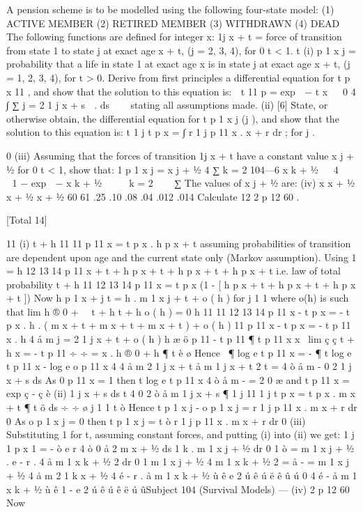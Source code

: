 A pension scheme is to be modelled using the following four-state model:
(1)
ACTIVE MEMBER
(2)
RETIRED MEMBER
(3)
WITHDRAWN
(4)
DEAD
The following functions are defined for integer x:
\mu 1j
x + t = force of transition from state 1 to state j at exact age x + t,
(j = 2, 3, 4), for 0 \leq t < 1.
t
(i)
p 1 x j = probability that a life in state 1 at exact age x is in state j at
exact age x + t, (j = 1, 2, 3, 4), for t > 0.
Derive from first principles a differential equation for t p x 11 , and show
that the solution to this equation is:
 t
11
p
=
exp
 −
t x

 0
4
∫ ∑ \mu
j = 2
1 j
x + s

. ds 


stating all assumptions made.
(ii)
[6]
State, or otherwise obtain, the differential equation for t p 1 x j (j ), and
show that the solution to this equation is:
t
1 j
t p x =
∫
r
1 j
p 11
x . \mu x + r dr ;
for j .

0
(iii)
Assuming that the forces of transition \mu 1j
x + t have a constant value
 x j + 1⁄2 for 0 \leq t < 1, show that:
1
p 1 x j =
 x j + 1⁄2
4
∑
k = 2
104—6
 x k + 1⁄2

 4
 
  1 − exp  −  x k + 1⁄2   
 k = 2
 

∑
The values of  x j + 1⁄2 are:
(iv)
x 
x + 1⁄2 
x + 1⁄2 
x + 1⁄2
60
61 .25
.10 .08
.04 .012
.014
Calculate
12
2
p 12
60 .

[Total 14]


\new%

11
(i)
t + h
11
11
p 11
x = t p x . h p x + t
assuming probabilities of transition are dependent upon age and the
current state only (Markov assumption).
Using 1 =
h
12
13
14
p 11
x + t + h p x + t + h p x + t + h p x + t
i.e. law of total probability
t + h
11
12
13
14
p 11
x = t p x (1 - [ h p x + t + h p x + t + h p x + t ])
Now
h
p 1 x + j t = h . m 1 x j + t + o ( h )
for j 1 1
where o(h) is such that lim
h ® 0 +
\
\
t + h
t + h
o ( h )
= 0
h
11
11
12
13
14
p 11
x - t p x = - t p x . h . ( m x + t + m x + t + m x + t ) + o ( h )
11
p 11
x - t p x
= - t p 11
x .
h
4
å m
j = 2
1 j
x + t
+
o ( h )
h
æ
ö
p 11 - t p 11
¶ t p 11
x
x
\ lim ç ç t + h x
= - t p 11
÷ ÷ =
x .
h ® 0 +
h
¶ t
è
ø
Hence
\
¶ log e t p 11
x
= -
¶ t
log e t p 11
x
-
log e o p 11
x
4
4
å m
2
1 j
x + t
å m
1 j
x + t
2
t
=
4
ò å m
-
0
2
1 j
x + s ds
As 0 p 11
x = 1
then
t
log e t p 11
x
4
ò å m
-
=
2
0
æ
and t p 11
x = exp ç -
ç
è
(ii)
1 j
x + s ds
t 4
0 2
ò å m
1 j
x + s
¶ 1 j
11
1 j
t p x = t p x . m x + t
¶ t
ö
ds ÷
÷
ø
j 1 1
t
ò
Hence t p 1 x j - o p 1 x j =
r
1 j
p 11
x . m x + r dr
0
As o p 1 x j = 0
then t p 1 x j =
t
ò
r
1 j
p 11
x . m x + r dr
0
(iii)
Substituting 1 for t, assuming constant forces, and putting (i) into (ii) we
get:
1 j
1 p x
1
=
-
ò
e
r 4
ò 0 å 2 m x + 1⁄2 ds
1 k
. m 1 x j + 1⁄2 dr
0
1
ò
= m 1 x j + 1⁄2 . e
- r .
4
å m 1 x k + 1⁄2
2
dr
0
1
m 1 x j + 1⁄2
4
m 1 x k + 1⁄2
2
=
å
-
=
m 1 x j + 1⁄2
4
å m
2
1 k
x + 1⁄2
4
é - r . å
m 1 x k + 1⁄2 ù
ê e 2
ú
ê
ú
ë ê
û ú 0
4
é
- å m 1 x k + 1⁄2 ù
ê 1 - e 2
ú
ê
ú
ê ë
ú ûSubject 104 (Survival Models) — %
(iv)
2
p 12
60
Now

